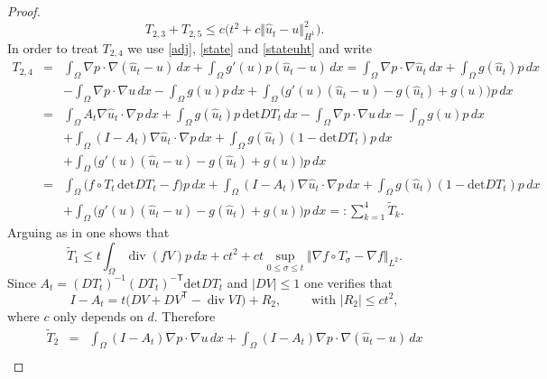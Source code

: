 \documentclass[a4paper,10pt]{article}
\newcommand{\dx}{\,dx}
\theoremstyle{plain}
\theoremstyle{plain}
\numberwithin{equation}{section}
\DeclareMathOperator{\Div}{div}
\begin{document}
\begin{proof}
\begin{equation} \label{eq:t23}
T_{2,3} +T_{2,5}  \leq c \bigl(  t^2 + c \Vert \hat u_t - u \Vert_{H^1}^2 \bigr). 
\end{equation} 
In order to treat $T_{2,4}$ we use  \eqref{adj}, \eqref{state} and \eqref{stateuht} and write
\begin{eqnarray*}
T_{2,4} &=& \int_{\Omega} \nabla p \cdot \nabla ( \hat u_t - u )  \dx + \int_{\Omega} g'(u) p (\hat u_t-u) \dx = \int_{\Omega} \nabla p \cdot \nabla \hat u_t  \dx +  \int_{\Omega}g(\hat u_t)p \dx \\
& & - \int_{\Omega} \nabla p \cdot \nabla u  \dx  - \int_{\Omega}g(u)p \dx 
 + \int_{\Omega} \bigl( g'(u)( \hat u_t -u) - g(\hat u_t) + g(u)) p \dx  \\
 & = & \int_{\Omega} A_t \nabla \hat u_t \cdot \nabla p \dx + \int_{\Omega} g(\hat u_t) p \, 
 \mbox{det} D T_t \dx - \int_{\Omega} \nabla p \cdot \nabla u  \dx  - \int_{\Omega}g(u)p \dx \\
 & & + \int_{\Omega} (I -A_t) \nabla \hat u_t \cdot \nabla p \dx + \int_{\Omega} g(\hat u_t) 
 (1 - \mbox{det} D T_t) p \dx \\
 & & + \int_{\Omega} \bigl( g'(u)( \hat u_t -u) - g(\hat u_t) + g(u)) p \dx  \\
 & = & \int_{\Omega}  \bigl( f \circ T_t \, \mbox{det} D T_t -f \bigr) p \dx
+ \int_{\Omega} (I -  A_t) \nabla \hat u_t \cdot \nabla p \dx + \int_{\Omega} g(\hat u_t) 
 (1 - \mbox{det} D T_t) p \dx \\
 & & + \int_{\Omega} \bigl( g'(u)( \hat u_t -u) - g(\hat u_t) + g(u)) p \dx=: \sum_{k=1}^4 \tilde T_k.
 \end{eqnarray*}
 Arguing as in \cite[(3.14)]{DHH25-convergence} one shows that 
\begin{equation} \label{eq:tildet1} 
\tilde T_1  \leq t \int_{\Omega} \Div( f V) p  \dx +  c t^2 + c t  \sup_{0 \leq \sigma \leq t} \Vert \nabla f \circ T_\sigma - \nabla f \Vert_{L^2}.  
\end{equation}
 Since  $A_t = (DT_t)^{-1} (DT_t)^{-\mathsf{T}} \mbox{det} DT_t$ and $| DV| \leq 1$
 one verifies that
\begin{equation} \label{idmat}
I - A_t = t \bigl( D V + D V^{\mathsf{T}} - \Div V I  \bigr) + R_2, \qquad \mbox{ with } | R_2  | \leq c t^2,
\end{equation}
where $c$ only depends on $d$. Therefore
\begin{eqnarray} 
\tilde T_2 & = & \int_{\Omega} (I- A_t) \nabla p \cdot \nabla u  \dx + \int_{\Omega} (I - A_t) \nabla p \cdot \nabla ( \hat u_t - u)  \dx \nonumber \\

\end{eqnarray}
\end{proof}
\end{document}
